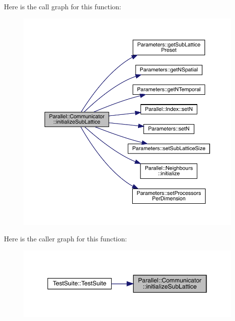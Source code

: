 Here is the call graph for this function\+:\nopagebreak
\begin{figure}[H]
\begin{center}
\leavevmode
\includegraphics[width=350pt]{class_parallel_1_1_communicator_a71baca622b377e6537799857be416a77_cgraph}
\end{center}
\end{figure}
Here is the caller graph for this function\+:\nopagebreak
\begin{figure}[H]
\begin{center}
\leavevmode
\includegraphics[width=340pt]{class_parallel_1_1_communicator_a71baca622b377e6537799857be416a77_icgraph}
\end{center}
\end{figure}
\mbox{\label{class_parallel_1_1_communicator_a6759125172843d9229c644f2a3a21ab7}} 
